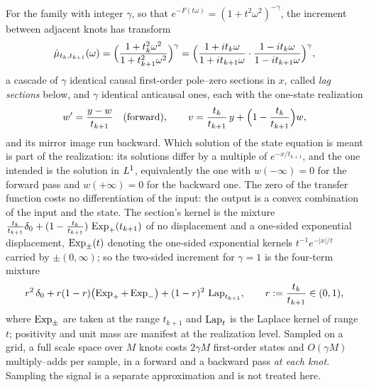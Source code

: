 \begin{proposition}
\label{prop:matern-cascade}
For the \Matern{} family with integer $\gamma$, so that $e^{-F(t\omega)} =
(1+t^2\omega^2)^{-\gamma}$, the increment between adjacent knots has transform
\begin{equation}\label{eq:matern-increment}
  \hat\mu_{t_k,t_{k+1}}(\omega)
  = \Bigl(\frac{1 + t_k^2\omega^2}{1 + t_{k+1}^2\omega^2}\Bigr)^{\gamma}
  = \Bigl(\frac{1 + it_k\omega}{1 + it_{k+1}\omega}\cdot
          \frac{1 - it_k\omega}{1 - it_{k+1}\omega}\Bigr)^{\gamma},
\end{equation}
a cascade of $\gamma$ identical causal first-order pole--zero sections in $x$, called \emph{lag
sections} below, and $\gamma$ identical anticausal ones, each with the one-state realization
\[
  w' = \frac{y - w}{t_{k+1}} \quad(\text{forward}),
  \qquad
  v = \frac{t_k}{t_{k+1}}\,y + \Bigl(1 - \frac{t_k}{t_{k+1}}\Bigr) w,
\]
and its mirror image run backward. Which solution of the state equation is meant is part of the
realization: its solutions differ by a multiple of $e^{-x/t_{k+1}}$, and the one intended is the
solution in $L^1$, equivalently the one with $w(-\infty) = 0$ for the forward pass and
$w(+\infty) = 0$ for the backward one. The zero of the transfer function costs no differentiation of
the input: the output is a convex combination of the input and the state. The section's kernel is
the mixture
$\tfrac{t_k}{t_{k+1}}\delta_0 + (1 - \tfrac{t_k}{t_{k+1}})\,\operatorname{Exp}_{+}(t_{k+1})$ of no
displacement and a one-sided exponential displacement, $\operatorname{Exp}_{\pm}(t)$ denoting the one-sided
exponential kernels $t^{-1}e^{-|x|/t}$ carried by $\pm(0,\infty)$; so the two-sided increment for
$\gamma = 1$ is the four-term mixture
\begin{equation}\label{eq:four-term}
  r^2\,\delta_0 + r(1-r)\bigl(\operatorname{Exp}_+ + \operatorname{Exp}_-\bigr) + (1-r)^2\,\operatorname{Lap}_{t_{k+1}},
  \qquad r := \frac{t_k}{t_{k+1}} \in (0,1),
\end{equation}
where $\operatorname{Exp}_\pm$ are taken at the range $t_{k+1}$ and $\operatorname{Lap}_t$ is the Laplace kernel of range
$t$; positivity and unit mass are manifest at the
realization level. Sampled on a grid, a full scale space over $M$ knots costs $2\gamma M$
first-order states and $O(\gamma M)$ multiply--adds per sample, in a forward and a backward pass
\emph{at each knot}. Sampling the signal
is a separate approximation and is not treated here.
\end{proposition}

